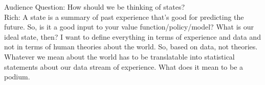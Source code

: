 Audience Question: How should we be thinking of states?\\

Rich: A state is a summary of past experience that's good for predicting the future. So, is it a good input to your value function/policy/model? What is our ideal state, then? I want to define everything in terms of experience and data and not in terms of human theories about the world. So, based on data, not theories. Whatever we mean about the world has to be translatable into statistical statements about our data stream of experience. What does it mean to be a podium.

\spacerule

